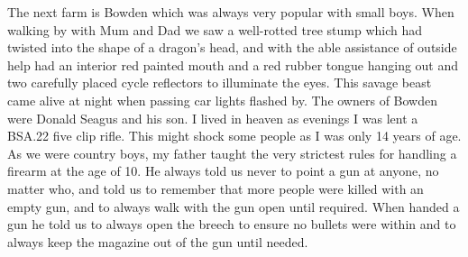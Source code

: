 The next farm is Bowden which was always very popular with small boys. When
walking by with Mum and Dad we saw a well-rotted tree stump which had twisted
into the shape of a dragon's head, and with the able assistance of outside help
had an interior red painted mouth and a red rubber tongue hanging out and two
carefully placed cycle reflectors to illuminate the eyes. This savage beast
came alive at night when passing car lights flashed by. The owners of Bowden
were Donald Seagus and his son. I lived in heaven as evenings I was lent a
BSA.22 five clip rifle. This might shock some people as I was only 14 years of
age. As we were country boys, my father taught the very strictest rules for
handling a firearm at the age of 10. He always told us never to point a gun at
anyone, no matter who, and told us to remember that more people were killed
with an empty gun, and to always walk with the gun open until required. When
handed a gun he told us to always open the breech to ensure no bullets were
within and to always keep the magazine out of the gun until needed.
